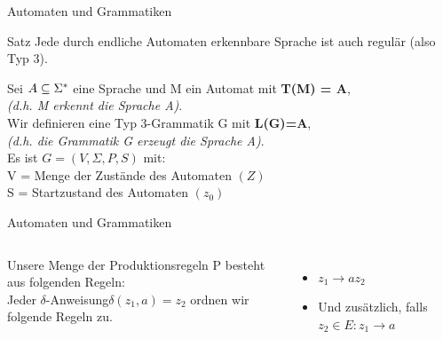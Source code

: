 \begin{frame}[fragile]{Automaten und Grammatiken}
    \begin{exampleblock}{Satz}
    Jede durch endliche Automaten erkennbare Sprache ist auch regulär (also Typ 3).
    \end{exampleblock}
   Sei \alert{$A \subseteq \Sigma^{*}$} eine Sprache und \alert{M ein Automat mit \textbf{T(M) = A}},\\ \emph{(d.h. M erkennt die Sprache A)}.\\
   \vspace{0.3cm}
   Wir definieren eine \alert{Typ 3-Grammatik G mit \textbf{L(G)=A}},\\ \emph{(d.h. die Grammatik G erzeugt die Sprache A)}.\\
   \vspace{0.3cm}
   Es ist $G=(V, \Sigma, P, S)$ mit:\\
   V = Menge der Zustände des Automaten $(Z)$\\
   S = Startzustand des Automaten $(z_0)$\\
    \vspace{0.3cm}
\end{frame}

\begin{frame}[fragile]{Automaten und Grammatiken}
    \begin{columns}
        Unsere Menge der Produktionsregeln P besteht aus folgenden Regeln:\\
        \vspace{0.3cm}
        Jeder \dq $\delta$-Anweisung\dq \alert{$\delta(z_1, a)=z_2$} ordnen wir folgende Regeln zu.
        \begin{itemize}
            \item \alert<2>{$z_1 \rightarrow a z_2$}
            \item Und zusätzlich, falls \alert<3>{$z_2 \in E: z_1 \rightarrow a$}
        \end{itemize}
        \centering
            
    \end{columns}
\end{frame}

